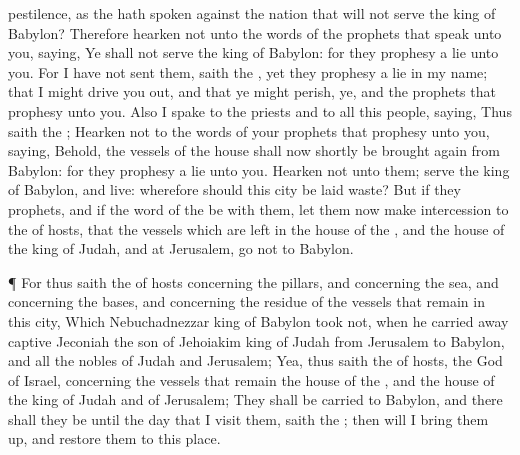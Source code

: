 {pestilence, as the
{} hath
spoken against the
nation that will not
serve the
king of
Babylon?
Therefore
hearken not unto the
words of the
prophets that
speak unto you,
saying, Ye shall not
serve the
king of
Babylon: for they
prophesy a
lie unto you.
For I have not
sent them,
saith the
{}, yet they
prophesy a
lie in my
name; that I might drive you
out, and that ye might
perish, ye, and the
prophets that
prophesy unto you.
Also I
spake to the
priests and to all this
people,
saying, Thus
saith the
{};
Hearken not to the
words of your
prophets that
prophesy unto you,
saying, Behold, the
vessels of the
{}
house shall now
shortly be brought
again from
Babylon: for they
prophesy a
lie unto you.
Hearken not unto them;
serve the
king of
Babylon, and
live: wherefore should this
city be laid
waste?
But if they
{}
prophets, and if the
word of the
{}
be with them, let them now make
intercession to the
{} of
hosts, that the
vessels which are
left in the
house of the
{}, and
{} the
house of the
king of
Judah, and at
Jerusalem,
go not to
Babylon.
\par }{\PP {}¶ For thus
saith the
{} of
hosts concerning the
pillars, and concerning the
sea, and concerning the
bases, and concerning the
residue of the
vessels that
remain in this
city,
Which
Nebuchadnezzar
king of
Babylon
took not, when he carried away
captive
Jeconiah the
son of
Jehoiakim
king of
Judah from
Jerusalem to
Babylon, and all the
nobles of
Judah and
Jerusalem;
Yea, thus
saith the
{} of
hosts, the
God of
Israel, concerning the
vessels that
remain
{} the
house of the
{}, and
{} the
house of the
king of
Judah and of
Jerusalem;
They shall be
carried to
Babylon, and there shall they be until the
day that I
visit them,
saith the
{}; then will I
bring them up, and
restore them to this
place.

}
